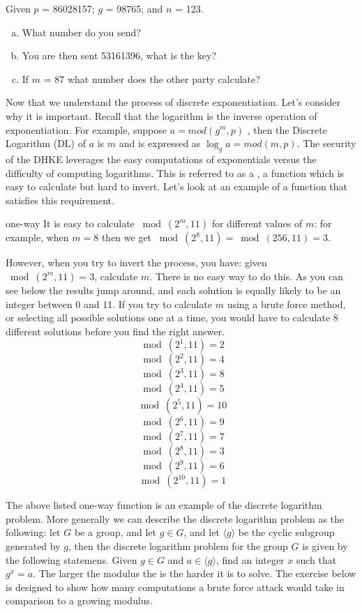 \begin{exer}
Given $p$ = 86028157; $g$ = 98765; and $n$ = 123.  
\begin{enumerate}[(a)]
\item	What number do you send?  

\item You are then sent 53161396, what is the key? 

\item If $m$ = 87 what number does the other party calculate?
\end{enumerate}
\end{exer}
Now that we understand the process of discrete exponentiation. Let's consider why it is important. Recall that the logarithm is the inverse operation of exponentiation.  For example, suppose $a = mod(g^m,p)$ , then the Discrete Logarithm (DL) of $a$ is $m$ and is expressed as    $\log_g a = mod(m,p)$.  The security of the DHKE leverages the easy computations of exponentials versus the difficulty of computing logarithms. This is referred to as a , a function which is easy to calculate but hard to invert.  Let's look at an example of a function that satisfies this requirement. 

\begin{example}{one-way}
It is easy to calculate $\bmod(2^{m},  11)$ for different values of $m$: for example, when $m =8$ then we get $\bmod(2^{8},  11) =\bmod(256,  11)  = 3$.  

However, when you try to invert the process, you have: given $\bmod(2^{m},  11) = 3$, calculate $m$. There is no easy way to do this. As you can see below the results jump around, and each solution is equally likely to be an integer between 0 and 11. If you try to calculate $m$ using a brute force method, or selecting all possible solutions one at a time, you would have to calculate 8 different solutions before you find the right answer. 
$$ \bmod(2^{1}, 11)=2$$
$$ \bmod(2^{2}, 11)=4$$
$$ \bmod(2^{3}, 11)=8$$
$$ \bmod(2^{4}, 11)=5$$
$$ \bmod(2^{5}, 11)=10$$
$$ \bmod(2^{6}, 11)=9$$
$$ \bmod(2^{7}, 11)=7$$
$$ \bmod(2^{8}, 11)=3$$
$$ \bmod(2^{9}, 11)=6$$
$$ \bmod(2^{10}, 11)=1$$
\end{example}

The above listed one-way function is an example of the discrete logarithm problem. More generally we can describe the discrete logarithm problem as the following: let $G$ be a group, and let $g \in G$, and let $\langle g \rangle$ be the cyclic subgroup generated by $g$, then the discrete logarithm problem for the group $G$ is given by the following statemens. Given $g \in G$ and $a \in \langle g \rangle$, find an integer $x$ such that $g^{x}=a$. The larger the modulus the is the harder it is to solve. The exercise below is designed to show how many computations a brute force attack would take in comparison to a growing modulus.

